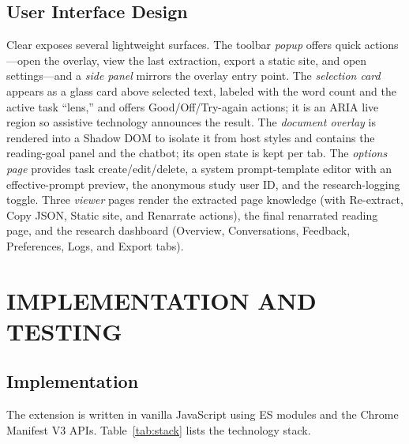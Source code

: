 \documentclass[a4paper,12pt]{report}
\begin{document}
\section{User Interface Design}
Clear exposes several lightweight surfaces. The toolbar \emph{popup} offers
quick actions---open the overlay, view the last extraction, export a static site,
and open settings---and a \emph{side panel} mirrors the overlay entry point. The
\emph{selection card} appears as a glass card above selected text, labeled with
the word count and the active task ``lens,'' and offers Good/Off/Try-again
actions; it is an ARIA live region so assistive technology announces the result.
The \emph{document overlay} is rendered into a Shadow DOM to isolate it from host
styles and contains the reading-goal panel and the chatbot; its open state is
kept per tab. The \emph{options page} provides task create/edit/delete, a system
prompt-template editor with an effective-prompt preview, the anonymous study user
ID, and the research-logging toggle. Three \emph{viewer} pages render the
extracted page knowledge (with Re-extract, Copy JSON, Static site, and Renarrate
actions), the final renarrated reading page, and the research dashboard (Overview,
Conversations, Feedback, Preferences, Logs, and Export tabs).

\chapter{IMPLEMENTATION AND TESTING}
\label{ch:impl}

\section{Implementation}
The extension is written in vanilla JavaScript using ES modules and the Chrome
Manifest V3 APIs. Table~\ref{tab:stack} lists the technology stack.
\end{document}
